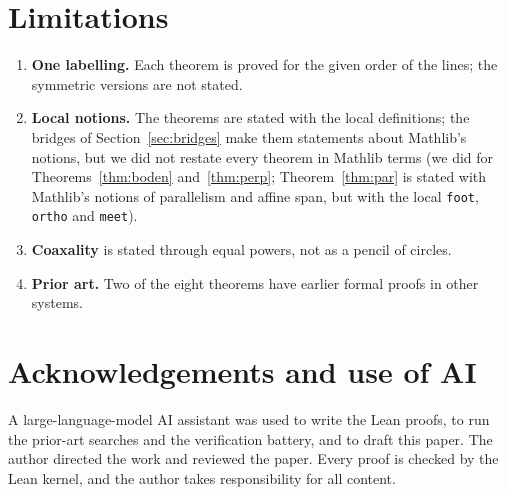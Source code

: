\documentclass[11pt]{article}
\theoremstyle{definition}
\theoremstyle{remark}
\newcommand{\lean}[1]{\texttt{#1}}
\begin{document}
\section{Limitations}\label{sec:limits}
\begin{enumerate}
\item \textbf{One labelling.} Each theorem is proved for the given order of the lines; the symmetric
versions are not stated.
\item \textbf{Local notions.} The theorems are stated with the local definitions; the bridges of
Section~\ref{sec:bridges} make them statements about Mathlib's notions, but we did not restate every
theorem in Mathlib terms (we did for Theorems~\ref{thm:boden} and~\ref{thm:perp}; Theorem~\ref{thm:par}
is stated with Mathlib's notions of parallelism and affine span, but with the local \lean{foot},
\lean{ortho} and \lean{meet}).
\item \textbf{Coaxality} is stated through equal powers, not as a pencil of circles.
\item \textbf{Prior art.} Two of the eight theorems have earlier formal proofs in other systems.
\end{enumerate}

\section*{Acknowledgements and use of AI}
A large-language-model AI assistant was used to write the Lean proofs, to run the prior-art searches
and the verification battery, and to draft this paper. The author directed the work and reviewed the
paper. Every proof is checked by the Lean kernel, and the author takes responsibility for all content.
\end{document}
